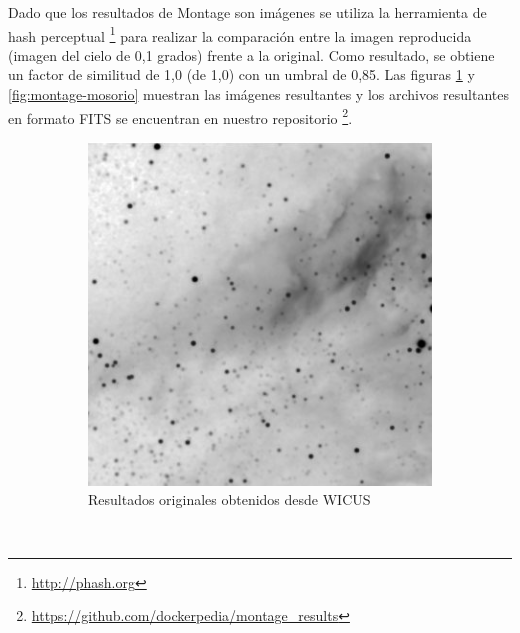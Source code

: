 Dado que los resultados de Montage son imágenes se utiliza la herramienta de hash perceptual \footnote{\url{http://phash.org}} para realizar la comparación entre la imagen reproducida (imagen del cielo de 0,1 grados) frente a la original.
Como resultado, se obtiene un factor de similitud de 1,0 (de 1,0) con un umbral de 0,85.
Las figuras \ref{fig:montage-wicus} y \ref{fig:montage-mosorio} muestran las imágenes resultantes y los archivos resultantes en formato FITS se encuentran en nuestro repositorio \footnote{\url{https://github.com/dockerpedia/montage_results}}. 

\begin{figure}[t]
    \centering
    \begin{subfigure}[b]{0.4\textwidth}
         \centering
         \includegraphics[width=\textwidth]{Figures/montage-original}
         \caption[Resultados workflow original: Montage]{Resultados originales obtenidos desde WICUS}
         \label{fig:montage-wicus}
     \end{subfigure}
         ~ 
	    \begin{subfigure}[b]{0.4\textwidth}
         \centering

\end{subfigure}
\end{figure}
